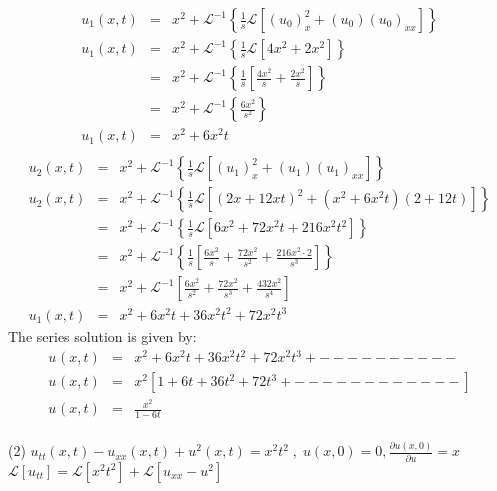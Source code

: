 \documentclass[a4paper 11pt]{article}
\newcommand{\Laplace}{\mathcal{L}}
\newcommand{\Un}[2]{u_{#1}(#2)}
\newcommand{\NI}{\noindent}
\newcommand{\InverseL}[1]{\Laplace^{-1}\left[#1\right]}
\newcommand{\LT}[1]{\Laplace \left[#1\right]}
\newcommand{\Unx}[1]{\Un{#1}{x,t}}
\newcommand{\InverseLx}[1]{\Laplace^{-1}\left\{ #1 \right\}}
\begin{document}
\begin{eqnarray*}
\Unx{1} &=& x^2 + \InverseLx{\frac{1}{s}\LT{\left(u_{0}\right)_{x}^{2} + \left(u_{0}\right)\left(u_{0}\right)_{xx}}}    \\[0.1cm]
\Unx{1} &=& x^2 + \InverseLx{\frac{1}{s}\LT{4x^2 + 2x^2}} \\[0.1cm]
&=& x^2 + \InverseLx{\frac{1}{s}\left[\frac{4x^2}{s} + \frac{2x^2}{s}\right]} \\[0.1cm]
&=& x^2 + \InverseLx{\frac{6x^2}{s^2}} \\[0.3cm]
\Unx{1} &=& x^2 + 6x^{2}t\\[0.1cm]
\label{eq:}
\end{eqnarray*}
\begin{eqnarray*}
\Unx{2} &=& x^2 + \InverseLx{\frac{1}{s}\LT{\left(u_{1}\right)_{x}^{2} + \left(u_{1}\right)\left(u_{1}\right)_{xx}}}    \\[0.1cm]
\Unx{2} &=& x^2 + \InverseLx{\frac{1}{s}\LT{(2x + 12xt)^2 + (x^2 + 6x^{2}t)(2+12t)}} \\[0.1cm]
&=& x^2 + \InverseLx{\frac{1}{s}\LT{6x^2 + 72x^2t + 216x^2t^2}} \\[0.1cm]
&=& x^2 + \InverseLx{\frac{1}{s}\left[\frac{6x^2}{s} + \frac{72x^2}{s^2} + \frac{216x^2 \cdot 2}{s^3} \right]} \\
&=& x^2 + \InverseL{\frac{6x^2}{s^2} + \frac{72x^2}{s^3} + \frac{432x^2}{s^4}}\\[0.3cm]
\Unx{1} &=& x^2 + 6x^2t + 36x^2t^2 + 72x^2t^3
\label{eq:}
\end{eqnarray*}
The series solution is given by:
\begin{eqnarray*}
\Unx{} &=& x^2 + 6x^2t + 36x^2t^2 + 72x^2t^3 + - - - - - - - - - -\\[0.25cm]
\Unx{} &=& x^2\left[1+6t + 36t^2 + 72t^3 + - - - - - - - - - - - -  \right] \\[0.27cm]
\Unx{} &=& \frac{x^2}{1-6t}\\
\label{eq:}
\end{eqnarray*}

\NI (2) $\displaystyle\Unx{tt} - \Unx{xx} + u^{2}(x,t) = x^2t^2 \; , \; u(x,0) = 0, \frac{\partial u(x,0)}{\partial u} = x 
$\\[0.4cm]
$\displaystyle
 \LT{u_{tt}} = \LT{x^2t^2} + \LT{u_{xx} - u^2}
$
\end{document}
